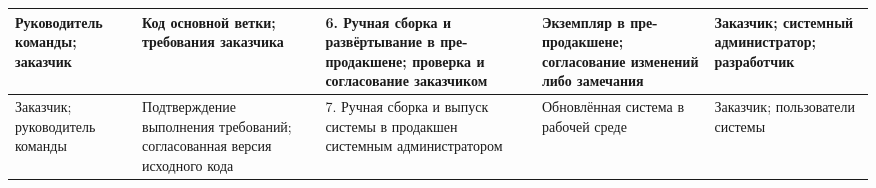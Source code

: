 \begin{landscape}
\begin{table}[p]
\begin{tabularx}{\linewidth}{|Y{0.9}|Y{0.95}|Y{1.3}|Y{1.05}|Y{0.8}|}
			\hline
			Руководитель команды; заказчик &
			Код основной ветки; требования заказчика &
			6. Ручная сборка и развёртывание в пре-продакшене; проверка и согласование заказчиком &
			Экземпляр в пре-продакшене; согласование изменений либо замечания &
			Заказчик; системный администратор; разработчик \\
			\hline
			Заказчик; руководитель команды &
			Подтверждение выполнения требований; согласованная версия исходного кода &
			7. Ручная сборка и выпуск системы в продакшен системным администратором &
			Обновлённая система в рабочей среде &
			Заказчик; пользователи системы \\
			\hline
		\end{tabularx}
	\end{table}
\end{landscape}

